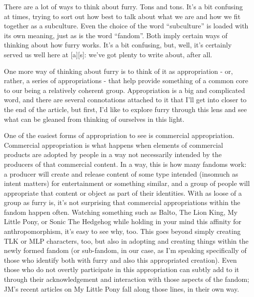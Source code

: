
There are a lot of ways to think about furry. Tons and tons. It's a bit confusing at times, trying to sort out how best to talk about what we are and how we fit together as a subculture. Even the choice of the word ``subculture'' is loaded with its own meaning, just as is the word ``fandom''. Both imply certain ways of thinking about how furry works. It's a bit confusing, but, well, it's certainly served us well here at {[}a{]}{[}s{]}: we've got plenty to write about, after all.

One more way of thinking about furry is to think of it as appropriation - or, rather, a series of appropriations - that help provide something of a common core to our being a relatively coherent group. Appropriation is a big and complicated word, and there are several connotations attached to it that I'll get into closer to the end of the article, but first, I'd like to explore furry through this lens and see what can be gleaned from thinking of ourselves in this light.

One of the easiest forms of appropriation to see is commercial appropriation. Commercial appropriation is what happens when elements of commercial products are adopted by people in a way not necessarily intended by the producers of that commercial content. In a way, this is how many fandoms work: a producer will create and release content of some type intended (insomuch as intent matters) for entertainment or something similar, and a group of people will appropriate that content or object as part of their identities. With as loose of a group as furry is, it's not surprising that commercial appropriations within the fandom happen often. Watching something such as Balto, The Lion King, My Little Pony, or Sonic The Hedgehog while holding in your mind this affinity for anthropomorphism, it's easy to see why, too. This goes beyond simply creating TLK or MLP characters, too, but also in adopting and creating things within the newly formed fandom (or sub-fandom, in our case, as I'm speaking specifically of those who identify both with furry and also this appropriated creation). Even those who do not overtly participate in this appropriation can subtly add to it through their acknowledgement and interaction with those aspects of the fandom; JM's recent articles on My Little Pony fall along those lines, in their own way.

